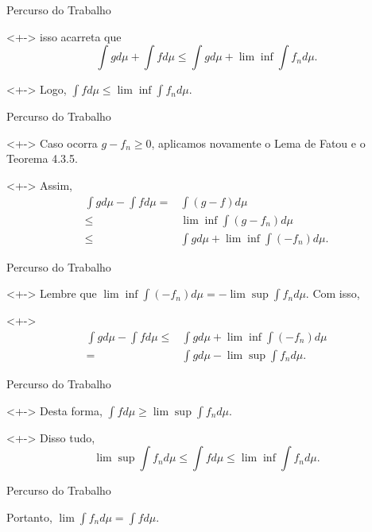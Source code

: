 	\begin{frame}{Percurso do Trabalho}
		\begin{block}<+->{}
			isso acarreta que 
			$$
			\int g d\mu + \int f d\mu \leq  \int g d\mu + \lim \inf \int f_n d\mu.
			$$
		\end{block}
		\begin{block}<+->{}
			Logo, $\displaystyle \int f d\mu \leq \lim \inf \int f_n d\mu$.
		\end{block}
	\end{frame}


	\begin{frame}{Percurso do Trabalho}
		\begin{block}<+->{}
			Caso ocorra $g - f_n \geq 0$, aplicamos novamente o Lema de Fatou e o Teorema 4.3.5.
		\end{block}
		\begin{block}<+->{}
			Assim, 
			\begin{align*}
				\int g d\mu - \int f d\mu = &\int (g - f) d\mu\\
				\leq  &\lim \inf \int (g - f_n) d\mu\\
				\leq &\int g d\mu + \lim \inf \int (- f_n) d\mu.
			\end{align*}
		\end{block}
	\end{frame}

	\begin{frame}{Percurso do Trabalho}
		\begin{block}<+->{}
			Lembre que $\displaystyle \lim \inf \int (- f_n) d\mu = - \lim \sup \int f_n d\mu$.
			Com isso, 
		\end{block}
		\begin{block}<+->{}
			\begin{align*}	
			\int g d\mu - \int f d\mu 
			\leq& 
			\int g d\mu + \lim \inf \int (- f_n) d\mu\\
			=&
			\int g d\mu - \lim \sup \int f_n d\mu.
			\end{align*}
		\end{block}
	\end{frame}
	\begin{frame}{Percurso do Trabalho}
		\begin{block}<+->{}
			Desta forma, $\displaystyle \int f d\mu \geq \lim \sup \int f_n d\mu$.
		\end{block}
		\begin{block}<+->{}
			Disso tudo,
			$$
			\lim \sup \int f_n d\mu \leq  \int f d\mu \leq \lim \inf \int f_n d\mu. 
			$$			
		\end{block}
	\end{frame}
	\begin{frame}{Percurso do Trabalho}
		\begin{block}{}
			Portanto, $\displaystyle \lim \int f_n d\mu =  \int f d\mu $.
		\end{block}
	\end{frame}












	
	
	
	
	

